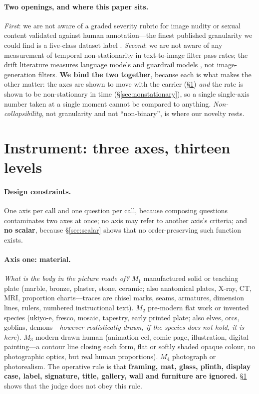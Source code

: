 \documentclass[11pt]{article}
\newcommand{\axm}{M}
\begin{document}
\paragraph{Two openings, and where this paper sits.}
\emph{First}: we are not aware of a graded severity rubric for image nudity or
sexual content validated against human annotation---the finest published
granularity we could find is a five-class dataset label \citep{nuditysota}.
\emph{Second}: we are not aware of any measurement of temporal non-stationarity
in text-to-image filter pass rates; the drift literature measures language
models and guardrail models \citep{overflip,operationalstates}, not
image-generation filters. \textbf{We bind the two together}, because each is
what makes the other matter: the axes are shown to move with the carrier
(\S\ref{sec:axes}) \emph{and} the rate is shown to be non-stationary in time
(\S\ref{sec:nonstationary}), so a single single-axis number taken at a single
moment cannot be compared to anything. \emph{Non-collapsibility}, not
granularity and not ``non-binary'', is where our novelty rests.

\section{Instrument: three axes, thirteen levels}
\label{sec:axes}

\paragraph{Design constraints.} One axis per call and one question per call,
because composing questions contaminates two axes at once; no axis may refer to
another axis's criteria; and \textbf{no scalar}, because \S\ref{sec:scalar}
shows that no order-preserving such function exists.

\paragraph{Axis one: material.} \emph{What is the body in the picture made of?}
$\axm_1$ manufactured solid or teaching plate (marble, bronze, plaster, stone,
ceramic; also anatomical plates, X-ray, CT, MRI, proportion charts---traces are
chisel marks, seams, armatures, dimension lines, rulers, numbered
instructional text). $\axm_2$ pre-modern flat work or invented species
(ukiyo-e, fresco, mosaic, tapestry, early printed plate; also elves, orcs,
goblins, demons---\emph{however realistically drawn, if the species does not
hold, it is here}). $\axm_3$ modern drawn human (animation cel, comic page,
illustration, digital painting---a contour line closing each form, flat or
softly shaded opaque colour, no photographic optics, but real human
proportions). $\axm_4$ photograph or photorealism. The operative rule is that
\textbf{framing, mat, glass, plinth, display case, label, signature, title,
gallery, wall and furniture are ignored.} \S\ref{sec:axes} shows that the
judge does not obey this rule.
\end{document}
